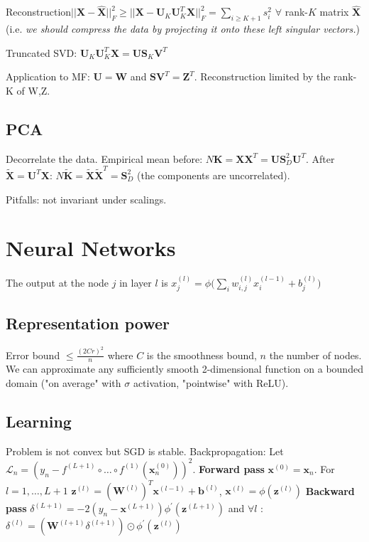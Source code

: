 Reconstruction\newline $||\mathbf{X}-\mathbf{\hat{X}}||_F^2 \ge ||\mathbf{X}-\mathbf{U}_K\mathbf{U}_K^T\mathbf{X}||_F^2 = \underset{i\ge K+1}{\sum} s_i^2$ $\forall$ rank-$K$ matrix $\mathbf{\hat{X}}$ (i.e. \textit{we should compress the data by projecting it onto these left singular vectors.})

Truncated SVD: $\mathbf{U}_K \mathbf{U}_K^T \mathbf{X} = \mathbf{U} \mathbf{S}_K \mathbf{V}^T$

Application to MF: $\mathbf{U} = \mathbf{W}$ and $\mathbf{S}\mathbf{V}^T = \mathbf{Z}^T$. Reconstruction limited by the rank-K of W,Z.

\subsection{PCA}
Decorrelate the data. Empirical mean before: $N\mathbf{K} = \mathbf{X}\mathbf{X}^T = \mathbf{U}\mathbf{S}_D^2\mathbf{U}^T$.
After $\mathbf{\tilde{X}} = \mathbf{U}^T\mathbf{X}$: $N\mathbf{\tilde{K}} = \mathbf{\tilde{X}}\mathbf{\tilde{X}}^T = \mathbf{S}_D^2$ (the components are uncorrelated).

Pitfalls: not invariant under scalings.

\section{Neural Networks}
The output at the node $j$ in layer $l$ is $x_j^{(l)} = \phi \big(\sum_i w_{i,j}^{(l)}x_i^{(l-1)} + b_j^{(l)} \big)$
\subsection{Representation power}
Error bound $\le \frac{(2Cr)^2}{n}$ where $C$ is the smoothness bound, $n$ the number of nodes. We can approximate any sufficiently smooth 2-dimensional function on a bounded domain ("on average" with $\sigma$ activation, "pointwise" with ReLU).
\subsection{Learning}
Problem is not convex but SGD is stable. Backpropagation:
Let $\mathcal{L}_n = (y_n - f^{(L+1)} \circ \dots \circ f^{(1)}(\mathbf{x}^{(0)}_n))^2$.\newline
\textbf{Forward pass} \newline $\mathbf{x}^{(0)}=\mathbf{x}_n$. For $l=1,\dots,L+1$ \newline
$\mathbf{z}^{(l)} = (\mathbf{W}^{(l)})^T\mathbf{x}^{(l-1)}+\mathbf{b}^{(l)}$, $\mathbf{x}^{(l)} = \phi(\mathbf{z}^{(l)})$\newline
\textbf{Backward pass} \newline $\delta^{(L+1)} = -2(y_n-\mathbf{x}^{(L+1)})\phi^{'}(\mathbf{z}^{(L+1)})$ and $\forall l$ :
$\delta^{(l)} = (\mathbf{W}^{(l+1)}\delta^{(l+1)}) \odot \phi^{'}(\mathbf{z}^{(l)})$ \newline

